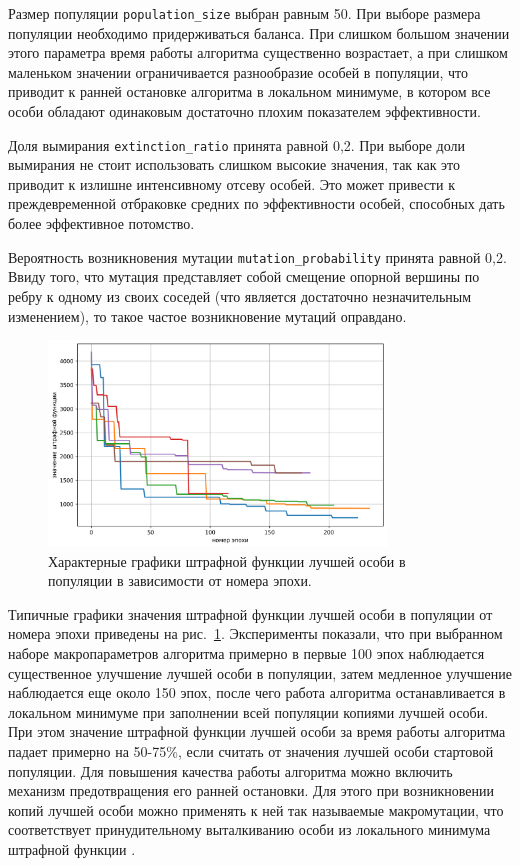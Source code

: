 Размер популяции \texttt{population\_size} выбран равным 50.
При выборе размера популяции необходимо придерживаться баланса.
При слишком большом значении этого параметра время работы алгоритма существенно возрастает, а при слишком маленьком значении ограничивается разнообразие особей в популяции, что приводит к ранней остановке алгоритма в локальном минимуме, в котором все особи обладают одинаковым достаточно плохим показателем эффективности.

Доля вымирания \texttt{extinction\_ratio} принята равной 0,2.
При выборе доли вымирания не стоит использовать слишком высокие значения, так как это приводит к излишне интенсивному отсеву особей.
Это может привести к преждевременной отбраковке средних по эффективности особей, способных дать более эффективное потомство.

Вероятность возникновения мутации \texttt{mutation\_probability} принята равной 0,2.
Ввиду того, что мутация представляет собой смещение опорной вершины по ребру к одному из своих соседей (что является достаточно незначительным изменением), то такое частое возникновение мутаций оправдано.

\begin{figure}[ht]
\centering
\includegraphics[width=0.8\textwidth]{./pics/text_2_genetic/chart1.png}
\caption{Характерные графики штрафной функции лучшей особи в популяции в зависимости от номера эпохи.}
\label{fig:text_2_genetic_chart1}
\end{figure}

Типичные графики значения штрафной функции лучшей особи в популяции от номера эпохи приведены на рис.~\ref{fig:text_2_genetic_chart1}.
Эксперименты показали, что при выбранном наборе макропараметров алгоритма примерно в первые 100 эпох наблюдается существенное улучшение лучшей особи в популяции, затем медленное улучшение наблюдается еще около 150 эпох, после чего работа алгоритма останавливается в локальном минимуме при заполнении всей популяции копиями лучшей особи.
При этом значение штрафной функции лучшей особи за время работы алгоритма падает примерно на 50-75\%, если считать от значения лучшей особи стартовой популяции.
Для повышения качества работы алгоритма можно включить механизм предотвращения его ранней остановки.
Для этого при возникновении копий лучшей особи можно применять к ней так называемые макромутации, что соответствует принудительному выталкиванию особи из локального минимума штрафной функции \cite{Baranov2025Gen}.

